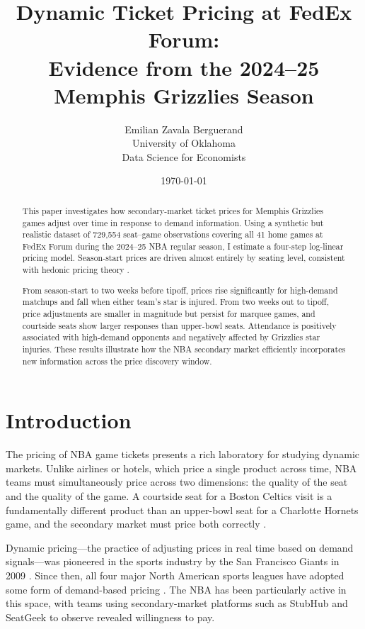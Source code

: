 \documentclass[12pt]{article}
\title{\textbf{Dynamic Ticket Pricing at FedEx Forum:}\\
       Evidence from the 2024--25 Memphis Grizzlies Season}
\author{Emilian Zavala Berguerand\\
        \small University of Oklahoma\\
        \small Data Science for Economists}
\date{\today}
\begin{document}
\maketitle
 
\begin{abstract}
\noindent
This paper investigates how secondary-market ticket prices for Memphis Grizzlies games adjust over time in response to demand information. Using a synthetic but realistic dataset of 729,554 seat--game observations covering all 41 home games at FedEx Forum during the 2024--25 NBA regular season, I estimate a four-step log-linear pricing model. Season-start prices are driven almost entirely by seating level, consistent with hedonic pricing theory \citep{rosen1974hedonic}.

From season-start to two weeks before tipoff, prices rise significantly for high-demand matchups and fall when either team's star is injured. From two weeks out to tipoff, price adjustments are smaller in magnitude but persist for marquee games, and courtside seats show larger responses than upper-bowl seats. Attendance is positively associated with high-demand opponents and negatively affected by Grizzlies star injuries. These results illustrate how the NBA secondary market efficiently incorporates new information across the price discovery window.
\end{abstract}
 
\newpage
\tableofcontents
\newpage
 
\section{Introduction}
 
The pricing of NBA game tickets presents a rich laboratory for studying dynamic markets. Unlike airlines or hotels, which price a single product across time, NBA teams must simultaneously price across two dimensions: the quality of the seat and the quality of the game. A courtside seat for a Boston Celtics visit is a fundamentally different product than an upper-bowl seat for a Charlotte Hornets game, and the secondary market must price both correctly \citep{drayer2012dynamic}.
 
Dynamic pricing---the practice of adjusting prices in real time based on demand signals---was pioneered in the sports industry by the San Francisco Giants in 2009 \citep{drayer2012dynamic}. Since then, all four major North American sports leagues have adopted some form of demand-based pricing \citep{paul2013determinants}. The NBA has been particularly active in this space, with teams using secondary-market platforms such as StubHub and SeatGeek to observe revealed willingness to pay.
 
\end{document}
